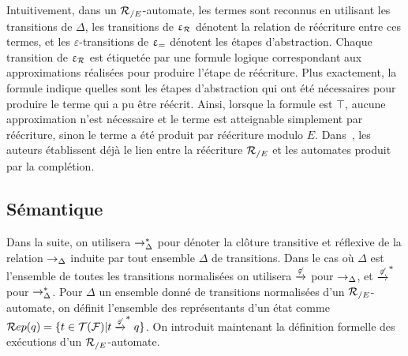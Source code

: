 Intuitivement, dans un ${\mathcal R_{/E}}$-automate, les termes sont reconnus en utilisant les transitions de $\Delta$, les transitions de $\upvarepsilon_{\mathcal R}$ dénotent la relation de réécriture
entre ces termes, et les $\varepsilon$-transitions de $\upvarepsilon_{=}$ dénotent
les étapes d'abstraction. Chaque transition de $\upvarepsilon_{\mathcal R}$ est étiquetée par une formule logique
correspondant aux approximations réalisées pour produire l'étape de réécriture. 
Plus exactement, la formule indique quelles sont les étapes d'abstraction qui ont été nécessaires 
pour produire le terme qui a pu être réécrit. 
Ainsi, lorsque la formule est $\top$, aucune approximation n'est nécessaire et le terme
est atteignable simplement par réécriture, sinon le terme a été produit par réécriture 
modulo $E$. Dans~\cite{GenetR-JSC10}, les auteurs établissent déjà le lien entre la réécriture ${\mathcal R_{/E}}$
et les automates produit par la complétion.




\subsection{Sémantique}







Dans la suite, on utilisera $\rightarrow_\Delta^*$ pour dénoter la clôture transitive et réflexive de 
la relation $\rightarrow_\Delta$ induite par tout ensemble $\Delta$ de transitions. 
Dans le cas où $\Delta$ est l'ensemble de toutes les transitions normalisées on utilisera $\xrightarrow{\not\varepsilon}$ 
pour $\rightarrow_\Delta$, et $\xrightarrow{\not\varepsilon}^*$ pour $\rightarrow^*_\Delta$.
Pour $\Delta$ un ensemble donné de transitions normalisées d'un ${\mathcal R_{/E}}$-automate, 
on définit l'ensemble des représentants d'un état comme $\mathcal R ep(q) = \{ t \in \mathcal{T(F)} | t \xrightarrow{\not\varepsilon}^* q\}$. 
On introduit maintenant la définition formelle des exécutions d'un ${\mathcal R_{/E}}$-automate.

